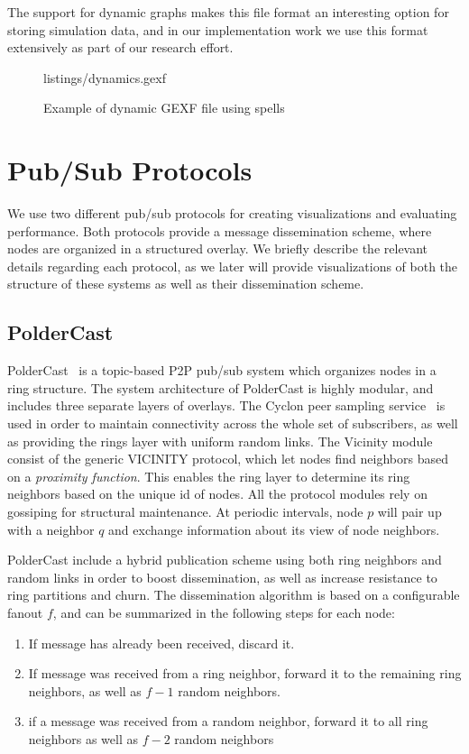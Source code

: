 The support for dynamic graphs makes this file format an interesting
option for storing simulation data, and in our implementation work we
use this format extensively as part of our research effort.

\begin{figure}
 {listings/dynamics.gexf}
\caption{Example of  dynamic GEXF file using spells}
\end{figure}


\section{Pub/Sub Protocols}
We use two different pub/sub protocols for creating visualizations and
evaluating performance. Both protocols provide a message dissemination
scheme, where nodes are organized in a structured overlay. We briefly
describe the relevant details regarding each protocol, as we later will
provide visualizations of both the structure of these systems as well as
their dissemination scheme.

\subsection{PolderCast}

PolderCast~\cite{Setty:2012} is a topic-based P2P pub/sub system which
organizes nodes in a ring structure. The system architecture of
PolderCast is highly modular, and includes three separate layers of
overlays. The Cyclon peer sampling service~\cite{} is used in order to
maintain connectivity across the whole set of subscribers, as well as
providing the rings layer with uniform random links. The Vicinity module
consist of the generic VICINITY protocol, which let nodes find neighbors
based on a \emph{proximity function}. This enables the ring layer to
determine its ring neighbors based on the unique id of nodes. All the
protocol modules rely on gossiping for structural maintenance. At
periodic intervals, node $p$ will pair up with a neighbor $q$
and exchange information about its view of node neighbors.

PolderCast include a hybrid publication scheme using both
ring neighbors and random links in order to boost
dissemination, as well as increase resistance to ring
partitions and churn. The dissemination algorithm is based
on a configurable fanout $f$, and can be summarized in the
following steps for each node:

\begin{enumerate}
    \item If message has already been received, discard it.
    \item If message was received from a ring neighbor, forward it
        to the remaining ring neighbors, as well as $f-1$ random
        neighbors.
    \item if a message was received from a random neighbor,
        forward it to all ring neighbors as well as $f-2$ random
        neighbors
\end{enumerate}

